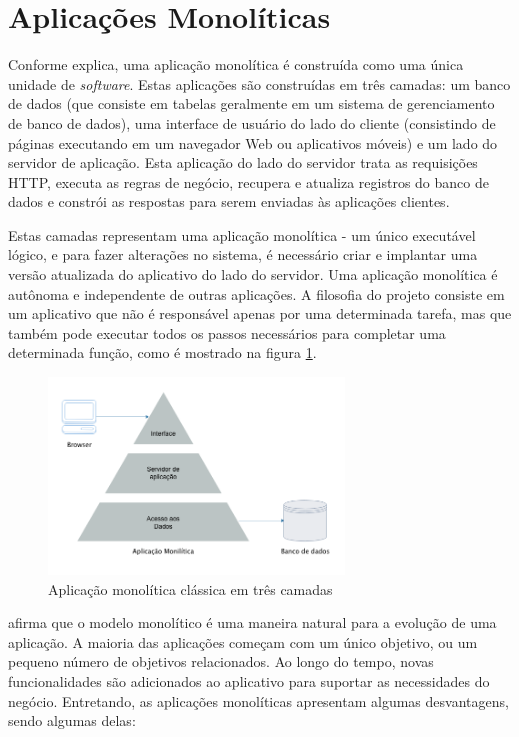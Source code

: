 \section{Aplicações Monolíticas}\label{sec:monolitico}

Conforme  explica, uma aplicação monolítica é construída como uma única unidade de \textit{software}. Estas aplicações são construídas em três camadas: um banco de dados (que consiste em tabelas geralmente em um sistema de gerenciamento de banco de dados), uma interface de usuário do lado do cliente (consistindo de páginas executando em um navegador Web ou aplicativos móveis) e um lado do servidor de aplicação. Esta aplicação do lado do servidor trata as requisições HTTP, executa as regras de negócio, recupera e atualiza registros do banco de dados e constrói as respostas para serem enviadas às aplicações clientes. 

Estas camadas representam uma aplicação monolítica - um único executável lógico, e para fazer alterações no sistema, é necessário criar e implantar uma versão atualizada do aplicativo do lado do servidor. Uma aplicação monolítica é autônoma e independente de outras aplicações. A filosofia do projeto consiste em um aplicativo que não é responsável apenas por uma determinada tarefa, mas que também pode executar todos os passos necessários para completar uma determinada função, como é mostrado na figura \ref{fig:three-tier}.

\begin{figure}[htbp]
    \centering
    \includegraphics[width=0.7\textwidth]{figuras/monolithic-3-tier.png}
    \caption{Aplicação monolítica clássica em três camadas}
    \label{fig:three-tier}
\end{figure}

 afirma que o modelo monolítico é uma maneira natural para a evolução de uma aplicação. A maioria das aplicações começam com um único objetivo, ou um pequeno número de objetivos relacionados. Ao longo do tempo, novas funcionalidades são adicionados ao aplicativo para suportar as necessidades do negócio. Entretando, as aplicações monolíticas apresentam algumas desvantagens, sendo algumas delas: 

